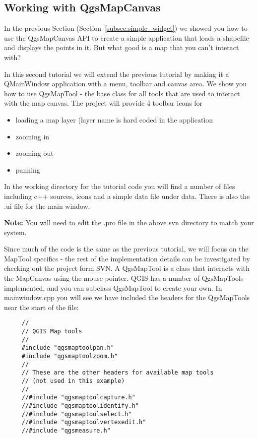\subsection{Working with QgsMapCanvas}

In the previous Section (Section~\ref{subsec:simple_widget}) we showed you how to use 
the QgsMapCanvas API to create a simple application that loads a shapefile and
displays the points in it. But what good is a map that you can't interact
with? 

In this second tutorial we will extend the previous tutorial by making it a
QMainWindow application with a menu, toolbar and canvas area. We show you how
to use QgsMapTool - the base class for all tools that are used to interact with
the map canvas. The project will provide 4 toolbar icons for

\begin{itemize}
 \item loading a map layer (layer name is hard coded in the application
 \item zooming in
 \item zooming out
 \item panning
\end{itemize}

In the working directory for the tutorial code you will find a number of files
including c++ sources, icons and a simple data file under data. There is also
the .ui file for the main window.

\textbf{Note:} You will need to edit the .pro file in the above svn directory to
match your system.

Since much of the code is the same as the previous tutorial, we will focus on
the MapTool specifics - the rest of the implementation details can be
investigated by checking out the project form SVN. A QgsMapTool is a class that
interacts with the MapCanvas using the mouse pointer. QGIS has a number of
QgsMapTools implemented, and you can subclass QgsMapTool to create your own. In
mainwindow.cpp you will see we have included the headers for the QgsMapTools near the
start of the file:

\begin{verbatim}
     //
     // QGIS Map tools
     //
     #include "qgsmaptoolpan.h"
     #include "qgsmaptoolzoom.h"
     //
     // These are the other headers for available map tools 
     // (not used in this example)
     //
     //#include "qgsmaptoolcapture.h"
     //#include "qgsmaptoolidentify.h"
     //#include "qgsmaptoolselect.h"
     //#include "qgsmaptoolvertexedit.h"
     //#include "qgsmeasure.h"
\end{verbatim}

